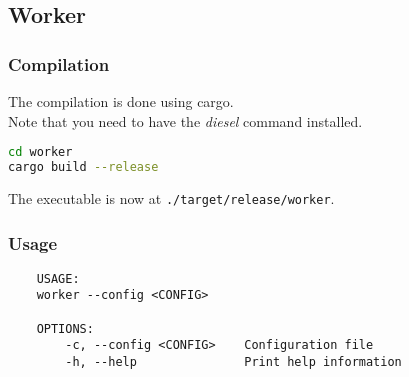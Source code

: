 \documentclass[../documentation.tex]{subfiles}
\begin{document}
\subsection{Worker}

\subsubsection{Compilation}

The compilation is done using cargo. \\
Note that you need to have the \textit{diesel} command installed.

\begin{lstlisting}[language=bash]
cd worker
cargo build --release
\end{lstlisting}

The executable is now at \texttt{./target/release/worker}.

\subsubsection{Usage}

\begin{lstlisting}
    USAGE:
    worker --config <CONFIG>

    OPTIONS:
        -c, --config <CONFIG>    Configuration file
        -h, --help               Print help information
\end{lstlisting}
\end{document}

